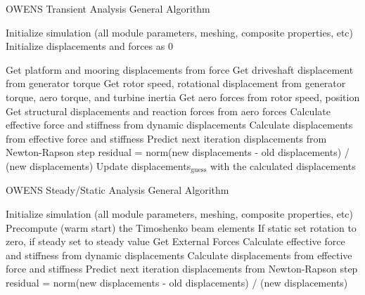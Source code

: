 \documentclass[11pt]{article}
\begin{document}
\begin{algorithm}
\caption{OWENS Transient Analysis General Algorithm}
\begin{spacing}{1.18}
\begin{algorithmic}[1]
\State Initialize simulation (all module parameters, meshing, composite properties, etc)
\State Initialize displacements and forces as 0


		\State Get platform and mooring displacements from force
		\State Get driveshaft displacement from generator torque
		\State Get rotor speed, rotational displacement from generator torque, aero torque, and turbine inertia
		\State Get aero forces from rotor speed, position
		\State Get structural displacements and reaction forces from aero forces
			\State Calculate effective force and stiffness from dynamic displacements
			\State Calculate displacements from effective force and stiffness
			\State Predict next iteration displacements from Newton-Rapson step
			\State residual = norm(new displacements - old displacements) / (new displacements)
		\EndWhile
		\State Update displacements$_\text{guess}$ with the calculated displacements
	\EndWhile
\EndFor

\end{algorithmic}
\end{spacing}
\label{alg:Transient}
\end{algorithm}


\begin{algorithm}
\caption{OWENS Steady/Static Analysis General Algorithm}
\begin{spacing}{1.18}
\begin{algorithmic}[1]

\State Initialize simulation (all module parameters, meshing, composite properties, etc)
\State Precompute (warm start) the Timoshenko beam elements
\State If static set rotation to zero, if steady set to steady value
	\State Get External Forces
	\State Calculate effective force and stiffness from dynamic displacements
	\State Calculate displacements from effective force and stiffness
	\State Predict next iteration displacements from Newton-Rapson step
	\State residual = norm(new displacements - old displacements) / (new displacements)
\EndWhile
\end{algorithmic}
\end{spacing}
\label{alg:Steady}
\end{algorithm}
\end{document}

